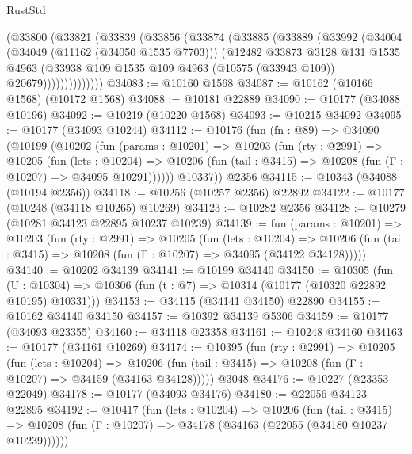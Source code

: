 \begin{lexlean}{RustStd}
\begin{coremodule}
          (@33800
            (@33821
              (@33839
                (@33856
                  (@33874
                    (@33885
                      (@33889
                        (@33992
                          (@34004
                            (@34049 (@11162 (@34050 @1535 @7703)))
                            (@12482
                              @33873
                              @3128
                              @131
                              @1535
                              @4963
                              (@33938
                                @109
                                @1535
                                @109
                                @4963
                                (@10575 (@33943 @109))
                                @20679))))))))))))))
@34083 := @10160 @1568
@34087 := @10162 (@10166 @1568) (@10172 @1568)
@34088 := @10181 @22889
@34090 := @10177 (@34088 @10196)
@34092 := @10219 (@10220 @1568)
@34093 := @10215 @34092
@34095 := @10177 (@34093 @10244)
@34112 := @10176
    (fun (fn : @89) =>
    @34090
      (@10199
        (@10202
          (fun (params : @10201) =>
          @10203
            (fun (rty : @2991) =>
            @10205
              (fun (lets : @10204) =>
              @10206 (fun (tail : @3415) => @10208 (fun (Γ : @10207) => @34095 @10291))))))
        @10337))
    @2356
@34115 := @10343 (@34088 (@10194 @2356))
@34118 := @10256 (@10257 @2356) @22892
@34122 := @10177 (@10248 (@34118 @10265) @10269)
@34123 := @10282 @2356
@34128 := @10279 (@10281 @34123 @22895 @10237 @10239)
@34139 := fun (params : @10201) =>
  @10203
    (fun (rty : @2991) =>
    @10205
      (fun (lets : @10204) =>
      @10206 (fun (tail : @3415) => @10208 (fun (Γ : @10207) => @34095 (@34122 @34128)))))
@34140 := @10202 @34139
@34141 := @10199 @34140
@34150 := @10305
    (fun (U : @10304) => @10306 (fun (t : @7) => @10314 (@10177 (@10320 @22892 @10195) @10331)))
@34153 := @34115 (@34141 @34150) @22890
@34155 := @10162 @34140 @34150
@34157 := @10392 @34139 @5306
@34159 := @10177 (@34093 @23355)
@34160 := @34118 @23358
@34161 := @10248 @34160
@34163 := @10177 (@34161 @10269)
@34174 := @10395
    (fun (rty : @2991) =>
    @10205
      (fun (lets : @10204) =>
      @10206 (fun (tail : @3415) => @10208 (fun (Γ : @10207) => @34159 (@34163 @34128)))))
    @3048
@34176 := @10227 (@23353 @22049)
@34178 := @10177 (@34093 @34176)
@34180 := @22056 @34123 @22895
@34192 := @10417
    (fun (lets : @10204) =>
    @10206
      (fun (tail : @3415) =>
      @10208 (fun (Γ : @10207) => @34178 (@34163 (@22055 (@34180 @10237 @10239))))))

\end{coremodule}
\end{lexlean}
